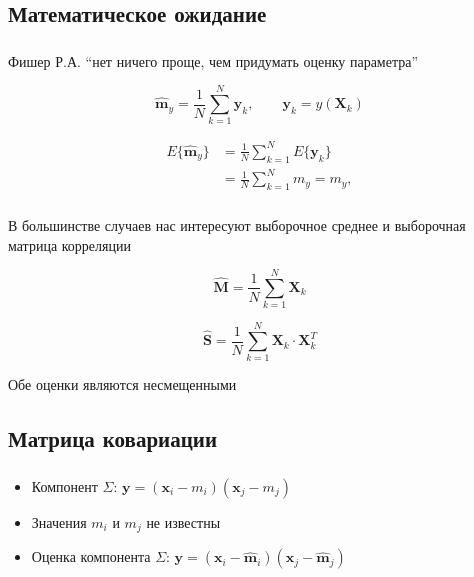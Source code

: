 \documentclass{beamer}
\begin{document}



\subsection{Математическое ожидание}

\begin{frame}
  \frametitle{\insertsection}
  \framesubtitle{\insertsubsection}
    Фишер Р.А.
  ``нет ничего проще, чем придумать оценку параметра'' \pause

  \begin{equation*}
   \displaystyle \mathbf{\widehat{m}}_y = \frac{1}{N} \sum_{k = 1}^{N} \mathbf{y}_k, \qquad \mathbf{y}_k = y(\mathbf{X}_k)
  \end{equation*} \pause

  \begin{align*}
    E\{\mathbf{\widehat{m}}_y\}
    &= \frac{1}{N} \sum_{k = 1}^{N} E\{ \mathbf{y}_k \} \\
    &= \frac{1}{N} \sum_{k = 1}^{N} m_y = m_y,
  \end{align*}

\end{frame}


\begin{frame}
  \frametitle{\insertsection}
  В большинстве случаев нас интересуют выборочное среднее и выборочная матрица корреляции

  \begin{equation*}
    \mathbf{\widehat{M}} = \frac{1}{N} \sum_{k = 1}^{N} \mathbf{X}_k
  \end{equation*}

  \begin{equation*}
    \mathbf{\widehat{S}} = \frac{1}{N} \sum_{k = 1}^{N} \mathbf{X}_k \cdot \mathbf{X}_k^T
  \end{equation*}

  Обе оценки являются \alert{несмещенными}

\end{frame}

\subsection{Матрица ковариации}

\begin{frame}
  \frametitle{\insertsection}
  \framesubtitle{\insertsubsection}

  \begin{itemize}
  \item Компонент $\Sigma$: $\mathbf{y} = (\mathbf{x}_i - m_i)(\mathbf{x}_j - m_j)$ \pause
  \item Значения $m_i$ и $m_j$ не известны \pause
  \item Оценка компонента $\Sigma$: $\mathbf{y} = (\mathbf{x}_i - \mathbf{\widehat{m}}_i)(\mathbf{x}_j - \mathbf{\widehat{m}}_j)$
  \end{itemize}

\end{frame}
\end{document}
